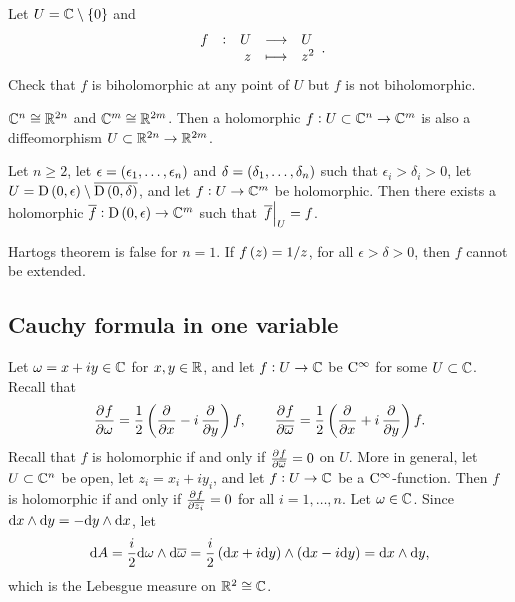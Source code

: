 \begin{example}
Let $ U = \CC \setminus \cbr{0} $ and
$$ \function[f]{U}{U}{z}{z^2}. $$
Check that $ f $ is biholomorphic at any point of $ U $ but $ f $ is not biholomorphic.
\end{example}

\begin{remark*}
$ \mathbb{C}^n \cong \mathbb{R}^{2n} $ and $ \mathbb{C}^m \cong \mathbb{R}^{2m} $. Then a holomorphic $ f : U \subset \mathbb{C}^n \to \mathbb{C}^m $ is also a diffeomorphism $ U \subset \mathbb{R}^{2n} \to \mathbb{R}^{2m} $.
\end{remark*}

\begin{theorem}[Hartogs]
Let $ n \ge 2 $, let $ \epsilon = \br{\epsilon_1, \dots, \epsilon_n} $ and $ \delta = \br{\delta_1, \dots, \delta_n} $ such that $ \epsilon_i > \delta_i > 0 $, let $ U = \D\br{0, \epsilon} \setminus \overline{\D\br{0, \delta}} $, and let $ f : U \to \mathbb{C}^m $ be holomorphic. Then there exists a holomorphic $ \overline{f} : \D\br{0, \epsilon} \to \CC^m $ such that $ \left. \overline{f} \right|_U = f $.
\end{theorem}

\begin{example*}
Hartogs theorem is false for $ n = 1 $. If $ f\br{z} = 1 / z $, for all $ \epsilon > \delta > 0 $, then $ f $ cannot be extended.
\end{example*}

\subsection{Cauchy formula in one variable}


Let $ \omega = x + iy \in \mathbb{C} $ for $ x, y \in \mathbb{R} $, and let $ f : U \to \mathbb{C} $ be $ \mathrm{C}^\infty $ for some $ U \subset \mathbb{C} $. Recall that
$$ \dpd{f}{\omega} = \dfrac{1}{2}\br{\dpd{}{x} - i\dpd{}{y}}f, \qquad \dpd{f}{\overline{\omega}} = \dfrac{1}{2}\br{\dpd{}{x} + i\dpd{}{y}}f. $$
Recall that $ f $ is holomorphic if and only if $ \tpd{f}{\overline{\omega}} = 0 $ on $ U $. More in general, let $ U \subset \mathbb{C}^n $ be open, let $ z_i = x_i + iy_i $, and let $ f : U \to \mathbb{C} $ be a $ \mathrm{C}^\infty $-function. Then $ f $ is holomorphic if and only if $ \tpd{f}{\overline{z_i}} = 0 $ for all $ i = 1, \dots, n $. Let $ \omega \in \mathbb{C} $. Since $ \mathrm{d} x \wedge \mathrm{d} y = -\mathrm{d} y \wedge \mathrm{d} x $, let
$$ \d A = \dfrac{i}{2} \d\omega \wedge \d\overline{\omega} = \dfrac{i}{2} \br{\d x + i \d y} \wedge \br{\d x - i \d y} = \d x \wedge \d y, $$
which is the Lebesgue measure on $ \mathbb{R}^2 \cong \mathbb{C} $.

